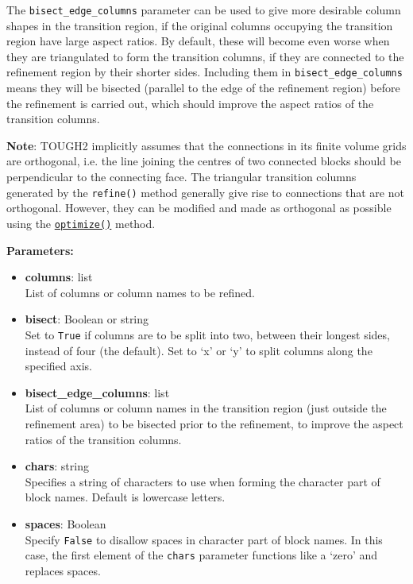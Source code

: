 The \texttt{bisect\_edge\_columns} parameter can be used to give more desirable column shapes in the transition region, if the original columns occupying the transition region have large aspect ratios.  By default, these will become even worse when they are triangulated to form the transition columns, if they are connected to the refinement region by their shorter sides.  Including them in \texttt{bisect\_edge\_columns} means they will be bisected (parallel to the edge of the refinement region) before the refinement is carried out, which should improve the aspect ratios of the transition columns.

\textbf{Note}: TOUGH2 implicitly assumes that the connections in its finite volume grids are orthogonal, i.e. the line joining the centres of two connected blocks should be perpendicular to the connecting face. The triangular transition columns generated by the \texttt{refine()} method generally give rise to connections that are not orthogonal. However, they can be modified and made as orthogonal as possible using the \hyperref[sec:mulgrid:optimize]{\texttt{optimize()}} method.

\textbf{Parameters:}
\begin{itemize}
  \item \textbf{columns}: list\\
    List of columns or column names to be refined.
  \item \textbf{bisect}: Boolean or string\\
    Set to \texttt{True} if columns are to be split into two, between their longest sides, instead of four (the default).  Set to `x' or `y' to split columns along the specified axis.
  \item \textbf{bisect\_edge\_columns}: list\\
    List of columns or column names in the transition region (just outside the refinement area) to be bisected prior to the refinement, to improve the aspect ratios of the transition columns.
  \item \textbf{chars}: string\\
    Specifies a string of characters to use when forming the character part of block names.  Default is lowercase letters.
\item \textbf{spaces}: Boolean\\
  Specify \texttt{False} to disallow spaces in character part of block names. In this case, the first element of the \texttt{chars} parameter functions like a `zero' and replaces spaces.
\end{itemize}

